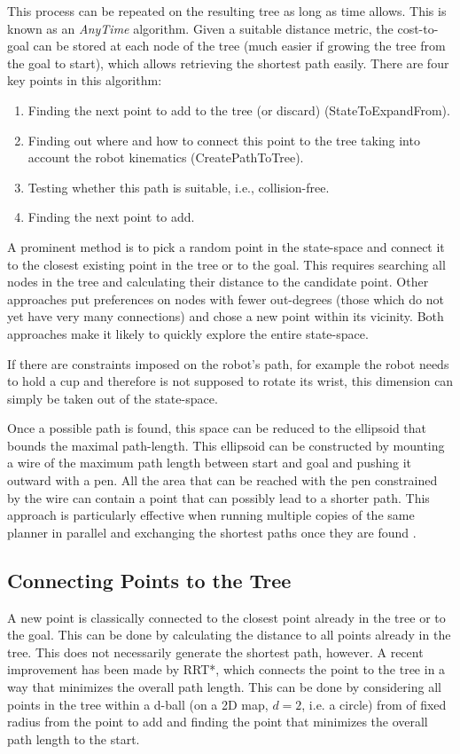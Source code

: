 This process can be repeated on the resulting tree as long as time allows. This is known as an  \emph{AnyTime} algorithm. Given a suitable distance metric, the cost-to-goal can be stored at each node of the tree (much easier if growing the tree from the goal to start), which allows retrieving the shortest path easily. There are four key points in this algorithm:

\begin{enumerate}
\item Finding the next point to add to the tree (or discard) (StateToExpandFrom).
\item Finding out where and how to connect this point to the tree taking into account the robot kinematics (CreatePathToTree).
\item Testing whether this path is suitable, i.e., collision-free.
\item Finding the next point to add.
\end{enumerate}

A prominent method is to pick a random point in the state-space and connect it to the closest existing point in the tree or to the goal. This requires searching all nodes in the tree and calculating their distance to the candidate point. Other approaches put preferences on nodes with fewer out-degrees (those which do not yet have very many connections) and chose a new point within its vicinity. Both approaches make it likely to quickly explore the entire state-space.

If there are constraints imposed on the robot's path, for example the robot needs to hold a cup and therefore is not supposed to rotate its wrist, this dimension can simply be taken out of the state-space.

Once a possible path is found, this space can be reduced to the ellipsoid that bounds the maximal path-length. This ellipsoid can be constructed by mounting a wire of the maximum path length between start and goal and pushing it outward with a pen. All the area that can be reached with the pen constrained by the wire can contain a point that can possibly lead to a shorter path. This approach is particularly effective when running multiple copies of the same planner in parallel and exchanging the shortest paths once they are found \cite{otte2012}.

\subsection{Connecting Points to the Tree}
A new point is classically connected to the closest point already in the tree or to the goal. This can be done by calculating the distance to all points already in the tree. This does not necessarily generate the shortest path, however. A recent improvement has been made by RRT*, which connects the point to the tree in a way that minimizes the overall path length. This can be done by considering all points in the tree within a d-ball (on a 2D map, $d=2$, i.e. a circle) from of fixed radius from the point to add and finding the point that minimizes the overall path length to the start.

